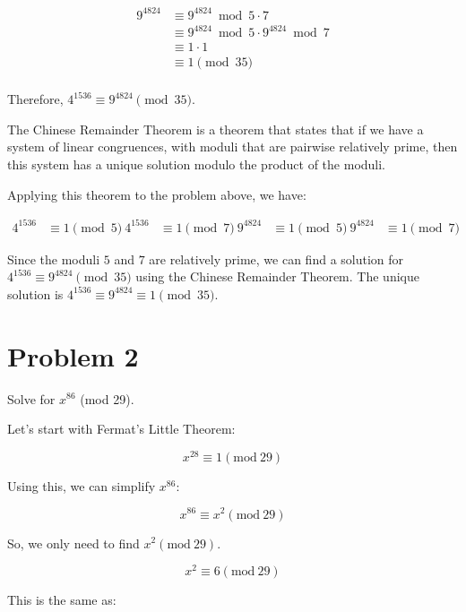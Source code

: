\documentclass[11pt]{article}
\begin{document}
\begin{align*}
9^{4824} &\equiv 9^{4824}\bmod 5\cdot7 \\
&\equiv 9^{4824}\bmod 5 \cdot 9^{4824}\bmod 7 \\
&\equiv 1 \cdot 1 \\
&\equiv 1 \pmod{35} \\
\end{align*}

Therefore, $4^{1536} \equiv 9^{4824} \pmod{35}$.

The Chinese Remainder Theorem is a theorem that states that if we have a system of linear congruences, with moduli that are pairwise relatively prime, then this system has a unique solution modulo the product of the moduli.

Applying this theorem to the problem above, we have:

\begin{align*}
4^{1536} &\equiv 1 \pmod 5 \
4^{1536} &\equiv 1 \pmod 7 \
9^{4824} &\equiv 1 \pmod 5 \
9^{4824} &\equiv 1 \pmod 7
\end{align*}

Since the moduli $5$ and $7$ are relatively prime, we can find a solution for $4^{1536} \equiv 9^{4824} \pmod{35}$ using the Chinese Remainder Theorem. The unique solution is $4^{1536} \equiv 9^{4824} \equiv 1 \pmod{35}$.

\pagebreak

\section*{Problem 2}

Solve for $x^{86}$ (mod 29). 

Let's start with Fermat's Little Theorem:

\begin{equation}
x^{28} \equiv 1 (\text{mod} \ 29)
\end{equation}

Using this, we can simplify $x^{86}$:

\begin{equation}
x^{86} \equiv x^2 (\text{mod} \ 29)
\end{equation}

So, we only need to find $x^2 (\text{mod} \ 29)$.

\begin{equation}
x^2 \equiv 6 (\text{mod} \ 29)
\end{equation}

This is the same as:
\end{document}
